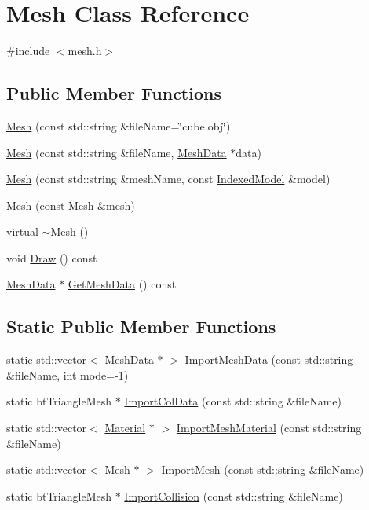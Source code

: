 \hypertarget{class_mesh}{}\section{Mesh Class Reference}
\label{class_mesh}


{\ttfamily \#include $<$mesh.\+h$>$}

\subsection*{Public Member Functions}
\begin{DoxyCompactItemize}
\item 
\hyperlink{class_mesh_a167934b0e617950bf4df22ea01b8704b}{Mesh} (const std\+::string \&file\+Name=\char`\"{}cube.\+obj\char`\"{})
\item 
\hyperlink{class_mesh_af2822b45c3cb647736cda3db9886dce2}{Mesh} (const std\+::string \&file\+Name, \hyperlink{class_mesh_data}{Mesh\+Data} $\ast$data)
\item 
\hyperlink{class_mesh_a077a578c62a22809ac88e47412a0c8cc}{Mesh} (const std\+::string \&mesh\+Name, const \hyperlink{class_indexed_model}{Indexed\+Model} \&model)
\item 
\hyperlink{class_mesh_ad0260249329b621d4d91c66293baef8d}{Mesh} (const \hyperlink{class_mesh}{Mesh} \&mesh)
\item 
virtual \hyperlink{class_mesh_a5efe4da1a4c0971cfb037bd70304c303}{$\sim$\+Mesh} ()
\item 
void \hyperlink{class_mesh_a295f283d6a6a2ca8e8e46e2fc2fbe727}{Draw} () const 
\item 
\hyperlink{class_mesh_data}{Mesh\+Data} $\ast$ \hyperlink{class_mesh_a957ca65ff9f05a82e8c50f3ac72b8618}{Get\+Mesh\+Data} () const 
\end{DoxyCompactItemize}
\subsection*{Static Public Member Functions}
\begin{DoxyCompactItemize}
\item 
static std\+::vector$<$ \hyperlink{class_mesh_data}{Mesh\+Data} $\ast$ $>$ \hyperlink{class_mesh_a7d62297804518c08fe8429dea702d4af}{Import\+Mesh\+Data} (const std\+::string \&file\+Name, int mode=-\/1)
\item 
static bt\+Triangle\+Mesh $\ast$ \hyperlink{class_mesh_a9834cb2e2924821f36b0c3e2a4c326e7}{Import\+Col\+Data} (const std\+::string \&file\+Name)
\item 
static std\+::vector$<$ \hyperlink{class_material}{Material} $\ast$ $>$ \hyperlink{class_mesh_ad1a6c1004ac4e073852989a3d68538d1}{Import\+Mesh\+Material} (const std\+::string \&file\+Name)
\item 
static std\+::vector$<$ \hyperlink{class_mesh}{Mesh} $\ast$ $>$ \hyperlink{class_mesh_af11b125a96697494a80c864e3d7c1864}{Import\+Mesh} (const std\+::string \&file\+Name)
\item 
static bt\+Triangle\+Mesh $\ast$ \hyperlink{class_mesh_a8d11f99b8d05289bb368f65618a32212}{Import\+Collision} (const std\+::string \&file\+Name)
\end{DoxyCompactItemize}


